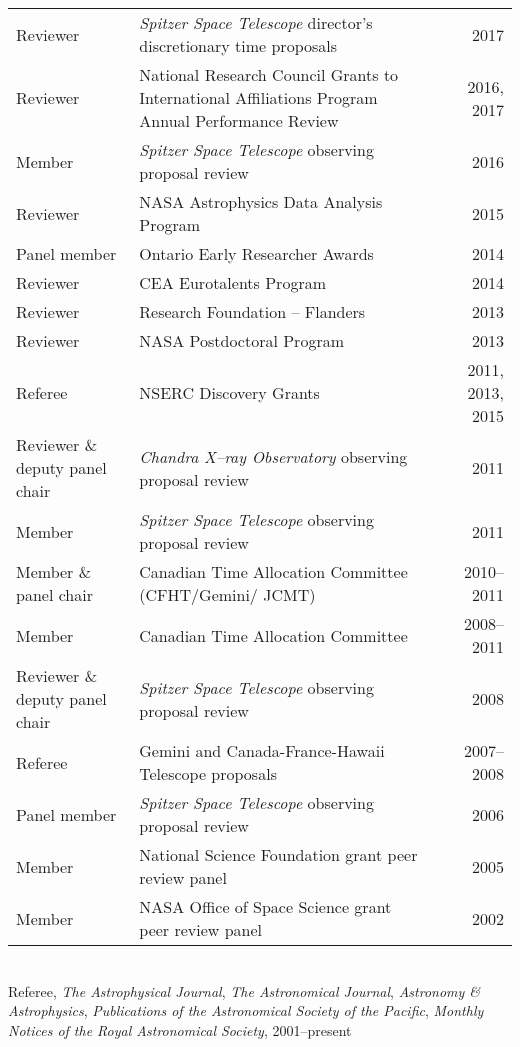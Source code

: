 \begin{tabularx}{\textwidth}{lXr}
Reviewer & {\it Spitzer Space Telescope\/} director's discretionary time proposals & 2017\\
Reviewer & National Research Council Grants to International Affiliations Program Annual Performance Review & 2016, 2017\\
Member& {\it Spitzer Space Telescope\/} observing proposal review&  2016\\
Reviewer& NASA Astrophysics Data Analysis Program& 2015\\
Panel member & Ontario Early Researcher Awards & 2014\\
Reviewer&  CEA Eurotalents Program & 2014\\
Reviewer& Research Foundation -- Flanders& 2013\\
Reviewer& NASA Postdoctoral Program& 2013\\
Referee& NSERC Discovery Grants& 2011, 2013, 2015\\
Reviewer \& deputy panel chair& {\it Chandra X--ray Observatory\/} observing proposal review& 2011\\
Member& {\it Spitzer Space Telescope\/} observing proposal review&  2011\\
Member \& panel chair& Canadian Time Allocation Committee (CFHT/Gemini/ JCMT)& 2010--2011\\
Member& Canadian Time Allocation Committee& 2008--2011\\
Reviewer \& deputy panel chair& {\it Spitzer Space Telescope\/} observing proposal review& 2008\\
Referee& Gemini and Canada-France-Hawaii Telescope proposals& 2007--2008\\
Panel member& {\it Spitzer Space Telescope\/} observing proposal review& 2006\\
Member& National Science Foundation grant peer review panel& 2005\\
Member& NASA Office of Space Science grant peer review panel& 2002\\
\end{tabularx}\\
\vspace{0.3cm}
Referee, {\it The Astrophysical Journal}, {\it The Astronomical Journal}, {\it Astronomy \& Astrophysics},
{\it Publications of the Astronomical Society of the Pacific}, {\it Monthly Notices of the Royal Astronomical Society},
2001--present

